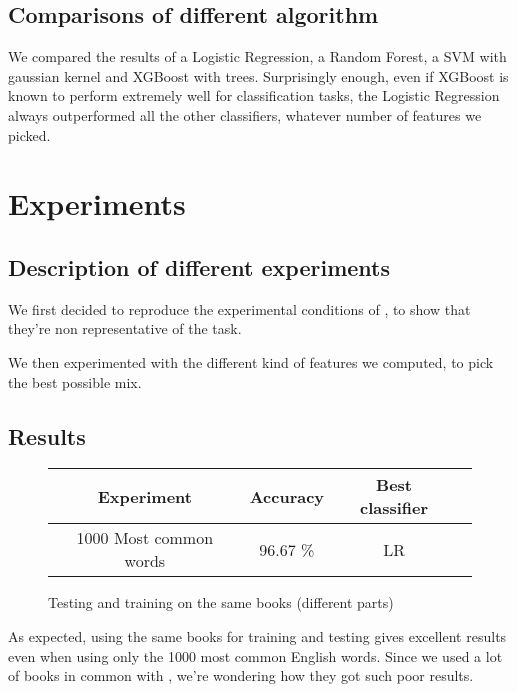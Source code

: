 \documentclass[10pt]{article}
\begin{document}
\subsection{Comparisons of different algorithm}
We compared the results of a Logistic Regression, a Random Forest, a SVM with gaussian kernel and XGBoost with trees. Surprisingly enough, even if XGBoost is known to perform extremely well for classification tasks, the Logistic Regression always outperformed all the other classifiers, whatever number of features we picked.

\section{Experiments}
\subsection{Description of different experiments}
We first decided to reproduce the experimental conditions of \cite{homemade}, to show that they're non representative of the task.


We then experimented with the different kind of features we computed, to pick the best possible mix.

\subsection{Results}
\begin{figure}[h]
\centering\begin{tabular}{|c|c|c|c|}
\hline 
Experiment & Accuracy & Best classifier\\
\hline 
1000 Most common words & 96.67 \% & LR \\
\hline
\end{tabular}
\caption{Testing and training on the same books (different parts)}
\end{figure}
As expected, using the same books for training and testing gives excellent results even when using only the 1000 most common English words. Since we used a lot of books in common with \cite{homemade}, we're wondering how they got such poor results.
\end{document}
